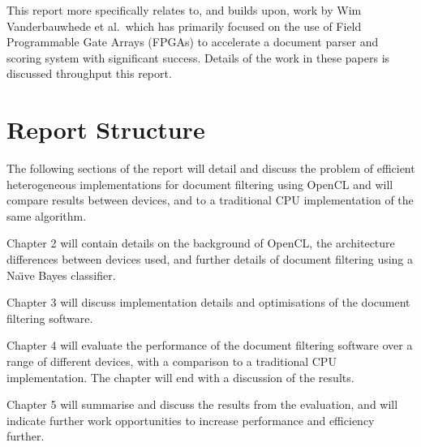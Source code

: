 This report more specifically relates to, and builds upon, work by Wim
Vanderbauwhede et al.\ which has primarily focused on the use of Field
Programmable Gate Arrays (FPGAs) to accelerate a document parser and scoring
system \cite{vanderbauwhede2013high} \cite{HybridCPUFPGA}
\cite{chalamalasetti2012evaluating} with significant success. Details of the
work in these papers is discussed throughput this report.

\section{Report Structure}

The following sections of the report will detail and discuss the problem of
efficient heterogeneous implementations for document filtering using OpenCL and
will compare results between devices, and to a traditional CPU implementation of
the same algorithm.

Chapter 2 will contain details on the background of OpenCL, the architecture
differences between devices used, and further details of document filtering
using a Na{\"{\i}}ve Bayes classifier.

Chapter 3 will discuss implementation details and optimisations of the document
filtering software.

Chapter 4 will evaluate the performance of the document filtering software over
a range of different devices, with a comparison to a traditional CPU
implementation. The chapter will end with a discussion of the results.

Chapter 5 will summarise and discuss the results from the evaluation, and will
indicate further work opportunities to increase performance and efficiency
further.
